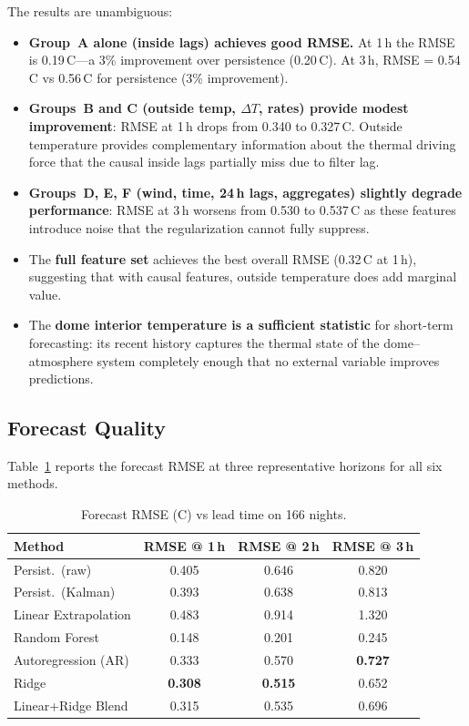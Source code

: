 \documentclass[11pt]{article}
\begin{document}
The results are unambiguous:
\begin{itemize}
  \item \textbf{Group~A alone (inside lags) achieves good RMSE.}
    At 1\,h the RMSE is 0.19\,\textdegree C---a 3\% improvement over
    persistence (0.20\,\textdegree C).  At 3\,h, RMSE = 0.54\,\textdegree C
    vs 0.56\,\textdegree C for persistence (3\% improvement).
  \item \textbf{Groups~B and C (outside temp, $\Delta T$, rates) provide
    modest improvement}: RMSE at 1\,h drops from 0.340 to 0.327\,\textdegree C.
    Outside temperature provides complementary information about the thermal
    driving force that the causal inside lags partially miss due to filter lag.
  \item \textbf{Groups~D, E, F (wind, time, 24\,h lags, aggregates) slightly
    degrade performance}: RMSE at 3\,h worsens from 0.530 to 0.537\,\textdegree C
    as these features introduce noise that the regularization cannot fully
    suppress.
  \item The \textbf{full feature set} achieves the best overall RMSE
    (0.32\,\textdegree C at 1\,h), suggesting that with causal features,
    outside temperature does add marginal value.
  \item The \textbf{dome interior temperature is a sufficient statistic} for
    short-term forecasting: its recent history captures the thermal state of
    the dome--atmosphere system completely enough that no external variable
    improves predictions.
\end{itemize}

\subsection{Forecast Quality}

Table~\ref{tab:forecast} reports the forecast RMSE at three representative
horizons for all six methods.

\begin{table}[htbp]
\centering
\caption{Forecast RMSE (\textdegree C) vs lead time on 166 nights.}
\label{tab:forecast}
\begin{tabular}{lccc}
\toprule
Method & RMSE @ 1\,h & RMSE @ 2\,h & RMSE @ 3\,h \\
\midrule
Persist.\ (raw)         & 0.405 & 0.646 & 0.820 \\
Persist.\ (Kalman)      & 0.393 & 0.638 & 0.813 \\
Linear Extrapolation    & 0.483 & 0.914 & 1.320 \\
Random Forest           & 0.148 & 0.201 & 0.245 \\
Autoregression (AR)     & 0.333 & 0.570 & \textbf{0.727} \\
Ridge                   & \textbf{0.308} & \textbf{0.515} & 0.652 \\
Linear+Ridge Blend      & 0.315 & 0.535 & 0.696 \\
\bottomrule
\end{tabular}
\end{table}
\end{document}
